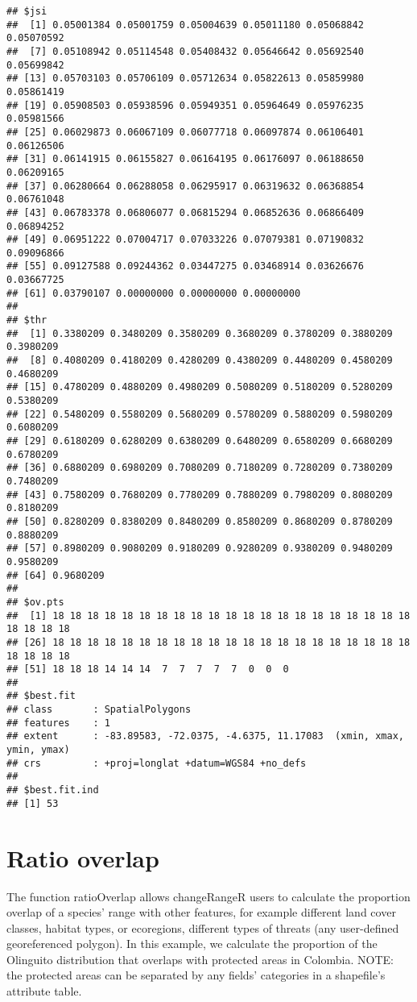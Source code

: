 \documentclass[
]{article}
\begin{document}
\begin{verbatim}
## $jsi
##  [1] 0.05001384 0.05001759 0.05004639 0.05011180 0.05068842 0.05070592
##  [7] 0.05108942 0.05114548 0.05408432 0.05646642 0.05692540 0.05699842
## [13] 0.05703103 0.05706109 0.05712634 0.05822613 0.05859980 0.05861419
## [19] 0.05908503 0.05938596 0.05949351 0.05964649 0.05976235 0.05981566
## [25] 0.06029873 0.06067109 0.06077718 0.06097874 0.06106401 0.06126506
## [31] 0.06141915 0.06155827 0.06164195 0.06176097 0.06188650 0.06209165
## [37] 0.06280664 0.06288058 0.06295917 0.06319632 0.06368854 0.06761048
## [43] 0.06783378 0.06806077 0.06815294 0.06852636 0.06866409 0.06894252
## [49] 0.06951222 0.07004717 0.07033226 0.07079381 0.07190832 0.09096866
## [55] 0.09127588 0.09244362 0.03447275 0.03468914 0.03626676 0.03667725
## [61] 0.03790107 0.00000000 0.00000000 0.00000000
## 
## $thr
##  [1] 0.3380209 0.3480209 0.3580209 0.3680209 0.3780209 0.3880209 0.3980209
##  [8] 0.4080209 0.4180209 0.4280209 0.4380209 0.4480209 0.4580209 0.4680209
## [15] 0.4780209 0.4880209 0.4980209 0.5080209 0.5180209 0.5280209 0.5380209
## [22] 0.5480209 0.5580209 0.5680209 0.5780209 0.5880209 0.5980209 0.6080209
## [29] 0.6180209 0.6280209 0.6380209 0.6480209 0.6580209 0.6680209 0.6780209
## [36] 0.6880209 0.6980209 0.7080209 0.7180209 0.7280209 0.7380209 0.7480209
## [43] 0.7580209 0.7680209 0.7780209 0.7880209 0.7980209 0.8080209 0.8180209
## [50] 0.8280209 0.8380209 0.8480209 0.8580209 0.8680209 0.8780209 0.8880209
## [57] 0.8980209 0.9080209 0.9180209 0.9280209 0.9380209 0.9480209 0.9580209
## [64] 0.9680209
## 
## $ov.pts
##  [1] 18 18 18 18 18 18 18 18 18 18 18 18 18 18 18 18 18 18 18 18 18 18 18 18 18
## [26] 18 18 18 18 18 18 18 18 18 18 18 18 18 18 18 18 18 18 18 18 18 18 18 18 18
## [51] 18 18 18 14 14 14  7  7  7  7  7  0  0  0
## 
## $best.fit
## class       : SpatialPolygons 
## features    : 1 
## extent      : -83.89583, -72.0375, -4.6375, 11.17083  (xmin, xmax, ymin, ymax)
## crs         : +proj=longlat +datum=WGS84 +no_defs 
## 
## $best.fit.ind
## [1] 53
\end{verbatim}

\hypertarget{ratio-overlap}{%
\section{Ratio overlap}\label{ratio-overlap}}

The function ratioOverlap allows changeRangeR users to calculate the
proportion overlap of a species' range with other features, for example
different land cover classes, habitat types, or ecoregions, different
types of threats (any user-defined georeferenced polygon). In this
example, we calculate the proportion of the Olinguito distribution that
overlaps with protected areas in Colombia. NOTE: the protected areas can
be separated by any fields' categories in a shapefile's attribute table.
\end{document}
